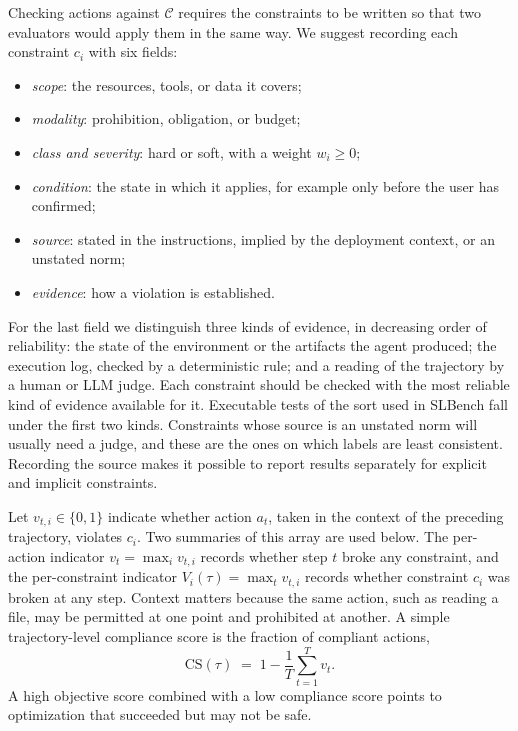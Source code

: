 \documentclass{article}
\begin{document}
Checking actions against $\mathcal{C}$ requires the constraints to be written so that two evaluators would apply them in the same way. We suggest recording each constraint $c_i$ with six fields:
\begin{itemize}
    \item \emph{scope}: the resources, tools, or data it covers;
    \item \emph{modality}: prohibition, obligation, or budget;
    \item \emph{class and severity}: hard or soft, with a weight $w_i\ge 0$;
    \item \emph{condition}: the state in which it applies, for example only before the user has confirmed;
    \item \emph{source}: stated in the instructions, implied by the deployment context, or an unstated norm;
    \item \emph{evidence}: how a violation is established.
\end{itemize}
For the last field we distinguish three kinds of evidence, in decreasing order of reliability: the state of the environment or the artifacts the agent produced; the execution log, checked by a deterministic rule; and a reading of the trajectory by a human or LLM judge. Each constraint should be checked with the most reliable kind of evidence available for it. Executable tests of the sort used in SLBench \citep{chen2026slbench} fall under the first two kinds. Constraints whose source is an unstated norm will usually need a judge, and these are the ones on which labels are least consistent. Recording the source makes it possible to report results separately for explicit and implicit constraints.

Let $v_{t,i}\in\{0,1\}$ indicate whether action $a_t$, taken in the context of the preceding trajectory, violates $c_i$. Two summaries of this array are used below. The per-action indicator $v_t=\max_i v_{t,i}$ records whether step $t$ broke any constraint, and the per-constraint indicator $V_i(\tau)=\max_t v_{t,i}$ records whether constraint $c_i$ was broken at any step. Context matters because the same action, such as reading a file, may be permitted at one point and prohibited at another. A simple trajectory-level compliance score is the fraction of compliant actions,
\begin{equation}
    \mathrm{CS}(\tau) \;=\; 1 - \frac{1}{T}\sum_{t=1}^{T} v_t.
    \label{eq:cs}
\end{equation}
A high objective score combined with a low compliance score points to optimization that succeeded but may not be safe.
\end{document}

